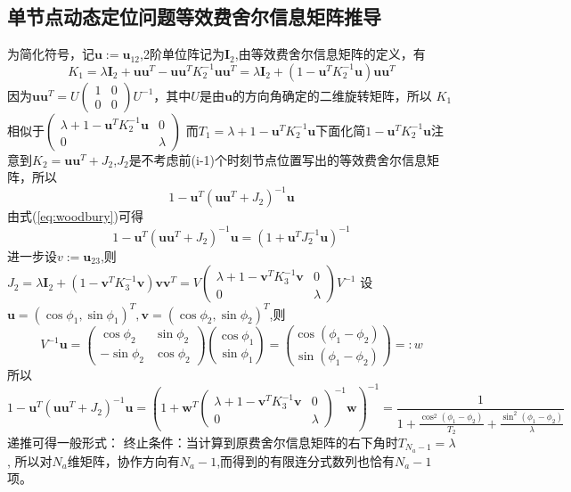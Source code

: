 \subsection{单节点动态定位问题等效费舍尔信息矩阵推导}\label{B_F_1}
为简化符号，记$\bm{u}:=\bm{u}_{12}$,2阶单位阵记为$\bm{I}_2$,由等效费舍尔信息矩阵的定义，有
\begin{equation}\label{eq:initial_efim}
  K_1=\lambda \bm{I}_2+\bm{u}\bm{u}^T-\bm{u}\bm{u}^T K_2^{-1}\bm{u}\bm{u}^T
  =\lambda \bm{I}_2+(1-\bm{u}^T K_2^{-1}\bm{u})\bm{u}\bm{u}^T
\end{equation}
因为$\bm{u}\bm{u}^T=U\begin{pmatrix}
                     1 & 0 \\
                     0 & 0
                   \end{pmatrix}U^{-1}$，其中$U$是由$\bm{u}$的方向角确定的二维旋转矩阵，所以
$K_1$相似于$\begin{pmatrix}
                           \lambda+1-\bm{u}^T K_2^{-1}\bm{u} & 0 \\
                           0 & \lambda
                         \end{pmatrix}$
而$T_1=\lambda+1-\bm{u}^T K_2^{-1}\bm{u}$下面化简$1-\bm{u}^T K_2^{-1}\bm{u}$注意到$K_2=\bm{u}\bm{u}^T+J_2$,$J_2$是不考虑前(i-1)个时刻节点位置写出的等效费舍尔信息矩阵，所以
\[
1-\bm{u}^T (\bm{u}\bm{u}^T+J_2)^{-1}\bm{u}
\]
由式(\ref{eq:woodbury})可得
\begin{equation}
1-\bm{u}^T (\bm{u}\bm{u}^T+J_2)^{-1}\bm{u}
=(1+\bm{u}^T J_2^{-1}\bm{u})^{-1}
\end{equation}
进一步设$v:=\bm{u}_{23}$,则$J_2=\lambda \bm{I}_2+(1-\bm{v}^T K_3^{-1}\bm{v})\bm{v}\bm{v}^T=V\begin{pmatrix}
                     \lambda+1-\bm{v}^T K_3^{-1}\bm{v} & 0 \\
                     0 & \lambda
                   \end{pmatrix}V^{-1}$
设$\bm{u}=(\cos\phi_1,\sin\phi_1)^T,\bm{v}=(\cos\phi_2,\sin\phi_2)^T$,则
\[
V^{-1}\bm{u}=\begin{pmatrix}
                     \cos\phi_2 & \sin\phi_2 \\
                     -\sin\phi_2 & \cos\phi_2
                   \end{pmatrix}\binom{\cos\phi_1}{\sin\phi_1}=\binom{\cos(\phi_1-\phi_2)}{\sin(\phi_1-\phi_2)}=:w
\]
所以
\[
1-\bm{u}^T (\bm{u}\bm{u}^T+J_2)^{-1}\bm{u}=(1+\bm{w}^T \begin{pmatrix}
                     \lambda+1-\bm{v}^T K_3^{-1}\bm{v} & 0 \\
                     0 & \lambda
                   \end{pmatrix}^{-1}\bm{w})^{-1}
                   =\frac{1}{1+\frac{\cos^2(\phi_1-\phi_2)}{T_2}+\frac{\sin^2(\phi_1-\phi_2)}{\lambda}}
\]
递推可得一般形式：
终止条件：当计算到原费舍尔信息矩阵的右下角时$T_{N_a-1}=\lambda$,
所以对$N_a$维矩阵，协作方向有$N_a-1$,而得到的有限连分式数列也恰有$N_a-1$项。
